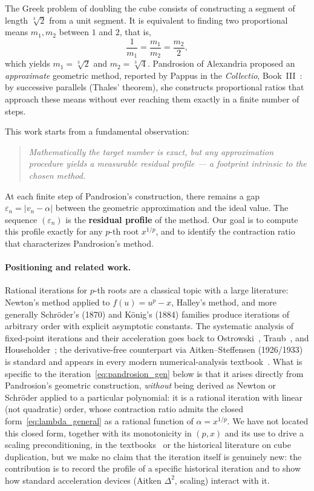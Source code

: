 \documentclass[11pt,a4paper]{article}
\theoremstyle{definition}
\newcommand{\cbrt}[1]{\sqrt[3]{#1}}
\newcommand{\eps}{\varepsilon}
\begin{document}
The Greek problem of doubling the cube consists of constructing a segment of length $\cbrt{2}$ from a unit segment. It is equivalent to finding two proportional means $m_1, m_2$ between $1$ and $2$, that is,
\[
  \frac{1}{m_1} = \frac{m_1}{m_2} = \frac{m_2}{2},
\]
which yields $m_1 = \cbrt{2}$ and $m_2 = \cbrt{4}$. Pandrosion of Alexandria proposed an \emph{approximate} geometric method, reported by Pappus in the \textit{Collectio}, Book~III~\cite{pappus}: by successive parallels (Thales' theorem), she constructs proportional ratios that approach these means without ever reaching them exactly in a finite number of steps.

\medskip

This work starts from a fundamental observation:

\begin{quote}
\itshape Mathematically the target number is exact, but any approximation procedure yields a measurable residual profile --- a footprint intrinsic to the chosen method.
\end{quote}

At each finite step of Pandrosion's construction, there remains a gap $\eps_n = |v_n - \alpha|$ between the geometric approximation and the ideal value. The sequence $(\eps_n)$ is the \textbf{residual profile} of the method. Our goal is to compute this profile exactly for any $p$-th root $x^{1/p}$, and to identify the contraction ratio that characterizes Pandrosion's method.

\medskip

\paragraph{Positioning and related work.}
Rational iterations for $p$-th roots are a classical topic with a large literature: Newton's method applied to $f(u) = u^p - x$, Halley's method, and more generally Schröder's (1870) and König's (1884) families produce iterations of arbitrary order with explicit asymptotic constants. The systematic analysis of fixed-point iterations and their acceleration goes back to Ostrowski~\cite{ostrowski}, Traub~\cite{traub}, and Householder~\cite{householder}; the derivative-free counterpart via Aitken--Steffensen (1926/1933) is standard and appears in every modern numerical-analysis textbook~\cite{stoer,numrecipes}.
What is specific to the iteration~\eqref{eq:pandrosion_gen} below is that it arises directly from Pandrosion's geometric construction, \emph{without} being derived as Newton or Schröder applied to a particular polynomial: it is a rational iteration with linear (not quadratic) order, whose contraction ratio admits the closed form~\eqref{eq:lambda_general} as a rational function of $\alpha = x^{1/p}$.
We have not located this closed form, together with its monotonicity in $(p,x)$ and its use to drive a scaling preconditioning, in the textbooks~\cite{stoer,numrecipes} or the historical literature on cube duplication, but we make no claim that the iteration itself is genuinely new: the contribution is to record the profile of a specific historical iteration and to show how standard acceleration devices (Aitken $\Delta^2$, scaling) interact with it.
\end{document}
